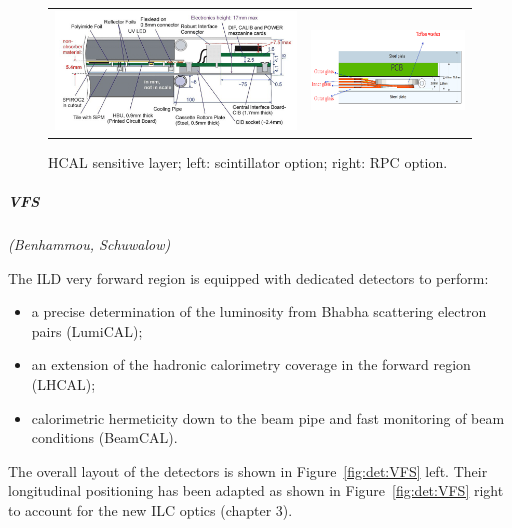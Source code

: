 \begin{figure}[t!]
\begin{tabular}{cc}
\includegraphics[width=0.5\hsize,viewport={0 -10 600 500},clip]{Detector/fig/AHCAL_layer.png} &
\includegraphics[width=0.5\hsize]{Detector/fig/SDHCAL_layer.png}
\end{tabular}
\caption{HCAL sensitive layer; left: scintillator option; right: RPC option.}
\label{fig:det:HCAL_readout}
\end{figure}


\vspace{1cm}
\subparagraph*{\bf VFS}
\textit{(Benhammou, Schuwalow)}

The ILD very forward region is equipped with dedicated detectors to perform:
\begin{itemize}
\item a precise determination of the luminosity from Bhabha scattering electron pairs (LumiCAL);
\item an extension of the hadronic calorimetry coverage in the forward region (LHCAL);
\item calorimetric hermeticity down to the beam pipe and fast monitoring of beam conditions (BeamCAL).
\end{itemize}
The overall layout of the detectors is shown in Figure~\ref{fig:det:VFS} left. Their longitudinal positioning has been adapted as shown in Figure~\ref{fig:det:VFS} right to account for the new ILC optics (chapter 3).  

